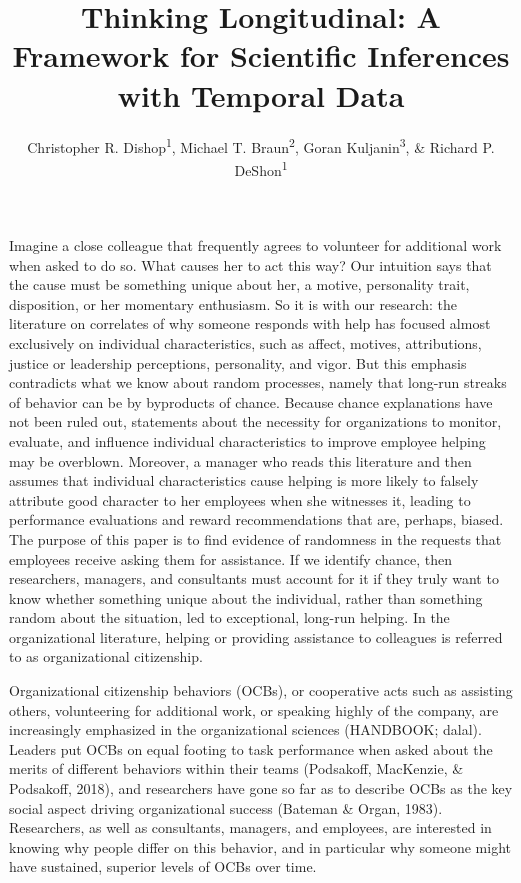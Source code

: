 \documentclass[english,,man]{apa6}
\title{Thinking Longitudinal: A Framework for Scientific Inferences with
Temporal Data}
\author{Christopher R. Dishop\textsuperscript{1}, Michael T.
Braun\textsuperscript{2}, Goran Kuljanin\textsuperscript{3}, \& Richard
P. DeShon\textsuperscript{1}}
\date{}
\affiliation{
\vspace{0.5cm}
\textsuperscript{1} Michigan State University\\\textsuperscript{2} University of South Florida\\\textsuperscript{3} DePaul University}
\theoremstyle{definition}
\theoremstyle{definition}
\theoremstyle{definition}
\theoremstyle{remark}
\begin{document}
\maketitle

Imagine a close colleague that frequently agrees to volunteer for
additional work when asked to do so. What causes her to act this way?
Our intuition says that the cause must be something unique about her, a
motive, personality trait, disposition, or her momentary enthusiasm. So
it is with our research: the literature on correlates of why someone
responds with help has focused almost exclusively on individual
characteristics, such as affect, motives, attributions, justice or
leadership perceptions, personality, and vigor. But this emphasis
contradicts what we know about random processes, namely that long-run
streaks of behavior can be by byproducts of chance. Because chance
explanations have not been ruled out, statements about the necessity for
organizations to monitor, evaluate, and influence individual
characteristics to improve employee helping may be overblown. Moreover,
a manager who reads this literature and then assumes that individual
characteristics cause helping is more likely to falsely attribute good
character to her employees when she witnesses it, leading to performance
evaluations and reward recommendations that are, perhaps, biased. The
purpose of this paper is to find evidence of randomness in the requests
that employees receive asking them for assistance. If we identify
chance, then researchers, managers, and consultants must account for it
if they truly want to know whether something unique about the
individual, rather than something random about the situation, led to
exceptional, long-run helping. In the organizational literature, helping
or providing assistance to colleagues is referred to as organizational
citizenship.

Organizational citizenship behaviors (OCBs), or cooperative acts such as
assisting others, volunteering for additional work, or speaking highly
of the company, are increasingly emphasized in the organizational
sciences (HANDBOOK; dalal). Leaders put OCBs on equal footing to task
performance when asked about the merits of different behaviors within
their teams (Podsakoff, MacKenzie, \& Podsakoff, 2018), and researchers
have gone so far as to describe OCBs as the key social aspect driving
organizational success (Bateman \& Organ, 1983). Researchers, as well as
consultants, managers, and employees, are interested in knowing why
people differ on this behavior, and in particular why someone might have
sustained, superior levels of OCBs over time.
\end{document}
